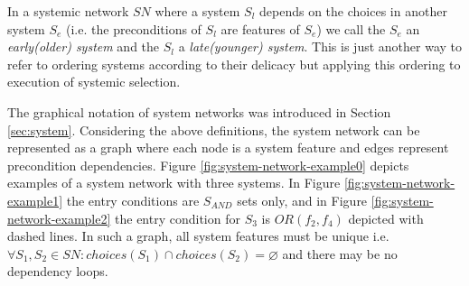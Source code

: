     In a systemic network $SN$ where a system $S_l$ depends on the choices in another system $S_e$ (i.e. the preconditions of $S_l$ are features of $S_e$) we call the $S_e$ an \textit{early(older) system} and the $S_l$ a \textit{late(younger) system}. This is just another way to refer to ordering systems according to their delicacy but applying this ordering to execution of systemic selection. 

    The graphical notation of system networks was introduced in Section \ref{sec:system}. Considering the above definitions, the system network can be represented as a graph where each node is a system feature and edges represent precondition dependencies. Figure \ref{fig:system-network-example0} depicts examples of a system network with three systems. In Figure \ref{fig:system-network-example1} the entry conditions are $S_{AND}$ sets only, and in Figure \ref{fig:system-network-example2} the entry condition for $S_3$ is $OR(f_2,f_4)$ depicted with dashed lines. In such a graph, all system features must be unique i.e. ${\forall S_1, S_2 \in SN: choices(S_1) \cap choices(S_2) = \varnothing}$ and there may be no dependency loops.

